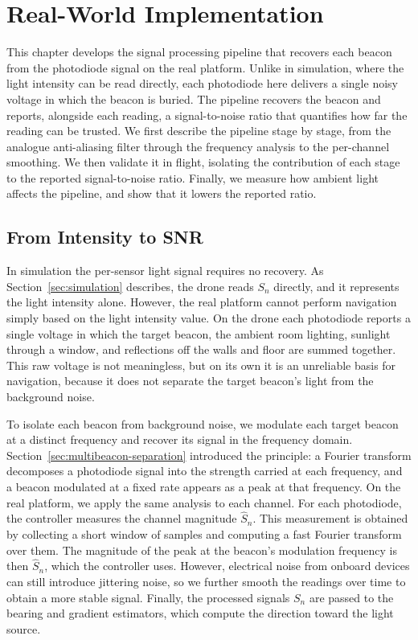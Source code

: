 \chapter{Real-World Implementation}
\label{chp:realworld}

This chapter develops the signal processing pipeline that recovers each beacon from the photodiode signal on the real platform. Unlike in simulation, where the light intensity can be read directly, each photodiode here delivers a single noisy voltage in which the beacon is buried. The pipeline recovers the beacon and reports, alongside each reading, a signal-to-noise ratio that quantifies how far the reading can be trusted. We first describe the pipeline stage by stage, from the analogue anti-aliasing filter through the frequency analysis to the per-channel smoothing. We then validate it in flight, isolating the contribution of each stage to the reported signal-to-noise ratio. Finally, we measure how ambient light affects the pipeline, and show that it lowers the reported ratio.

\section{From Intensity to SNR}
\label{sec:intensity-to-snr}

In simulation the per-sensor light signal requires no recovery. As Section~\ref{sec:simulation} describes, the drone reads $S_n$ directly, and it represents the light intensity alone. However, the real platform cannot perform navigation simply based on the light intensity value. On the drone each photodiode reports a single voltage in which the target beacon, the ambient room lighting, sunlight through a window, and reflections off the walls and floor are summed together. This raw voltage is not meaningless, but on its own it is an unreliable basis for navigation, because it does not separate the target beacon's light from the background noise.

To isolate each beacon from background noise, we modulate each target beacon at a distinct frequency and recover its signal in the frequency domain. Section~\ref{sec:multibeacon-separation} introduced the principle: a Fourier transform decomposes a photodiode signal into the strength carried at each frequency, and a beacon modulated at a fixed rate appears as a peak at that frequency. On the real platform, we apply the same analysis to each channel. For each photodiode, the controller measures the channel magnitude $\hat{S}_n$. This measurement is obtained by collecting a short window of samples and computing a fast Fourier transform over them. The magnitude of the peak at the beacon's modulation frequency is then $\hat{S}_n$, which the controller uses. However, electrical noise from onboard devices can still introduce jittering noise, so we further smooth the readings over time to obtain a more stable signal. Finally, the processed signals $S_n$ are passed to the bearing and gradient estimators, which compute the direction toward the light source.


